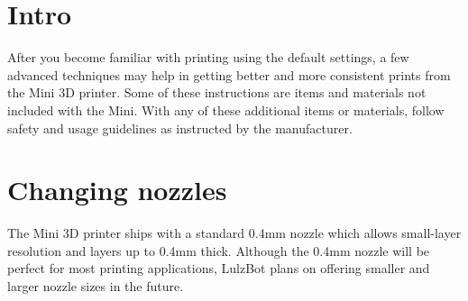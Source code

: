 %
%
%
%
%
%

\section{Intro}
After you become familiar with printing using the default settings, a few advanced techniques may help in getting better and more consistent prints from the Mini 3D printer. Some of these instructions are items and materials not included with the Mini. With any of these additional items or materials, follow safety and usage guidelines as instructed by the manufacturer.

\section{Changing nozzles}
The Mini 3D printer ships with a standard 0.4mm nozzle which allows small-layer resolution and layers up to 0.4mm thick. Although the 0.4mm nozzle will be perfect for most printing applications, LulzBot plans on offering smaller and larger nozzle sizes in the future.

